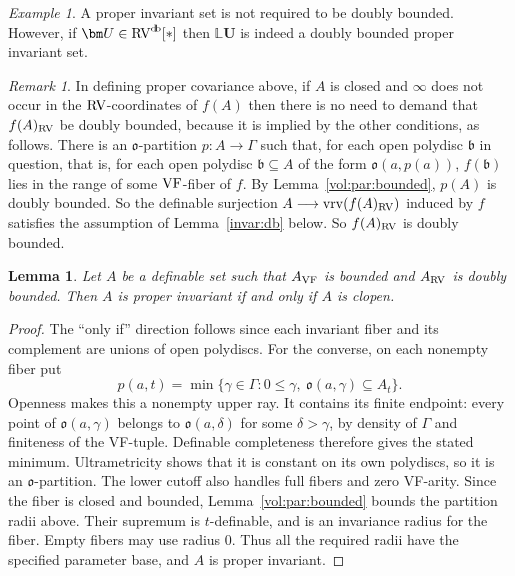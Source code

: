 \documentclass[12pt]{amsart}
\theoremstyle{plain}
\newtheorem{lem}[thm]{Lemma}
\theoremstyle{definition}
\theoremstyle{remark}
\newtheorem{rem}[thm]{Remark}
\newtheorem{exam}[thm]{Example}
\numberwithin{equation}{section}
\theoremstyle{plain}
\newcommand{\VF}{\textup{VF}}
\newcommand{\RV}{\textup{RV}}
\newcommand{\gb}{\mathfrak{b}}
\newcommand{\go}{\mathfrak{o}}
\newcommand{\0}{\emptyset}
\newcommand{\bb}[1]{\mathbb{#1}}
\newcommand{\fun}{\longrightarrow}
\newcommand{\sub}{\subseteq}
\DeclareMathOperator{\vrv}{vrv}
\DeclareMathOperator{\db}{d \! b}
\begin{document}
\begin{exam}
A proper invariant set  is not required to be doubly bounded. However, if $\bm U \in \RV^{\db}[*]$ then $\bb L \bm U$ is indeed a doubly bounded proper invariant set.
\end{exam}

\begin{rem}
In defining proper covariance above, if  $A$ is closed and $\infty$ does not occur in the $\RV$-coordinates of $f(A)$ then  there is no need to demand that $f(A)_{\RV}$ be doubly bounded, because it is implied by the other conditions, as follows. There is an $\go$-partition $p: A \fun \Gamma$ such that, for each open polydisc $\gb$ in question, that is, for each open polydisc $\gb \sub A$ of the form $\go(a, p(a))$, $f(\gb)$ lies in the range of some $\VF$-fiber of $f$. By Lemma~\ref{vol:par:bounded}, $p(A)$ is doubly bounded. So the definable surjection $A \fun \vrv(f(A)_{\RV})$ induced by $f$ satisfies the assumption of Lemma~\ref{invar:db} below. So  $f(A)_{\RV}$ is doubly bounded.
\end{rem}

\begin{lem}\label{inv:crit}
Let $A$ be a definable set such that $A_{\VF}$ is bounded and $A_{\RV}$ is doubly bounded. Then $A$ is proper invariant if and only if $A$ is clopen.
\end{lem}
\begin{proof}
The ``only if'' direction follows since each invariant fiber and its complement are unions of open polydiscs. For the converse, on each nonempty fiber put
\[
p(a,t)=\min\{\gamma\in\Gamma:0\leq\gamma,\ \go(a,\gamma)\sub A_t\}.
\]
Openness makes this a nonempty upper ray. It contains its finite endpoint: every point of $\go(a,\gamma)$ belongs to $\go(a,\delta)$ for some $\delta>\gamma$, by density of $\Gamma$ and finiteness of the VF-tuple. Definable completeness therefore gives the stated minimum. Ultrametricity shows that it is constant on its own polydiscs, so it is an $\go$-partition. The lower cutoff also handles full fibers and zero VF-arity. Since the fiber is closed and bounded, Lemma~\ref{vol:par:bounded} bounds the partition radii above. Their supremum is $t$-definable, and is an invariance radius for the fiber. Empty fibers may use radius $0$. Thus all the required radii have the specified parameter base, and $A$ is proper invariant.
\end{proof}
\end{document}
